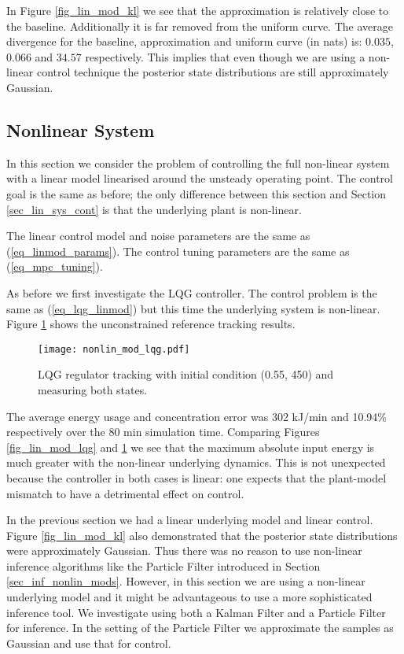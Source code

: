 In Figure \ref{fig_lin_mod_kl} we see that the approximation is relatively close to the baseline. Additionally it is far removed from the uniform curve. The average divergence for the baseline, approximation and uniform curve (in nats) is: $0.035$, $0.066$ and $34.57$ respectively. This implies that even though we are using a non-linear control technique the posterior state distributions are still approximately Gaussian. 


\subsection{Nonlinear System}
In this section we consider the problem of controlling the full non-linear system with a linear model linearised around the unsteady operating point. The control goal is the same as before; the only difference between this section and Section \ref{sec_lin_sys_cont} is that the underlying plant is non-linear.

The linear control model and noise parameters are the same as (\ref{eq_linmod_params}). The control tuning parameters are the same as (\ref{eq_mpc_tuning}).

As before we first investigate the LQG controller. The control problem is the same as (\ref{eq_lqg_linmod}) but this time the underlying system is non-linear. Figure \ref{fig_nonlin_lqg} shows the unconstrained reference tracking results.
\begin{figure}[H] 
\centering
\texttt{[image: nonlin\_mod\_lqg.pdf]}
\caption{LQG regulator tracking with initial condition (0.55, 450) and measuring both states.}
\label{fig_nonlin_lqg}
\end{figure}
The average energy usage and concentration error was 302 kJ/min and 10.94\% respectively over the 80 min simulation time. Comparing Figures \ref{fig_lin_mod_lqg} and \ref{fig_nonlin_lqg} we see that the maximum absolute input energy is much greater with the non-linear underlying dynamics. This is not unexpected because the controller in both cases is linear: one expects that the plant-model mismatch to have a detrimental effect on control.

In the previous section we had a linear underlying model and linear control. Figure \ref{fig_lin_mod_kl} also demonstrated that the posterior state distributions were approximately Gaussian. Thus there was no reason to use non-linear inference algorithms like the Particle Filter introduced in Section \ref{sec_inf_nonlin_mods}. However, in this section we are using a non-linear underlying model and it might be advantageous to use a more sophisticated inference tool. We investigate using both a Kalman Filter and a Particle Filter for inference. In the setting of the Particle Filter we approximate the samples as Gaussian and use that for control.

